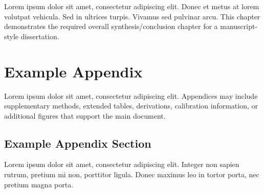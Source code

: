 \documentclass[doctoral,fulldocument,secnum,pdfonly,boundcover]{uofm}
\begin{document}
Lorem ipsum dolor sit amet, consectetur adipiscing elit. Donec et metus at lorem
volutpat vehicula. Sed in ultrices turpis. Vivamus sed pulvinar arcu. This
chapter demonstrates the required overall synthesis/conclusion chapter for a
manuscript-style dissertation.






\appendix

\chapter{Example Appendix}

Lorem ipsum dolor sit amet, consectetur adipiscing elit. Appendices may include
supplementary methods, extended tables, derivations, calibration information, or
additional figures that support the main document.

\section{Example Appendix Section}

Lorem ipsum dolor sit amet, consectetur adipiscing elit. Integer non sapien
rutrum, pretium mi non, porttitor ligula. Donec maximus leo in tortor porta,
nec pretium magna porta.
\end{document}
